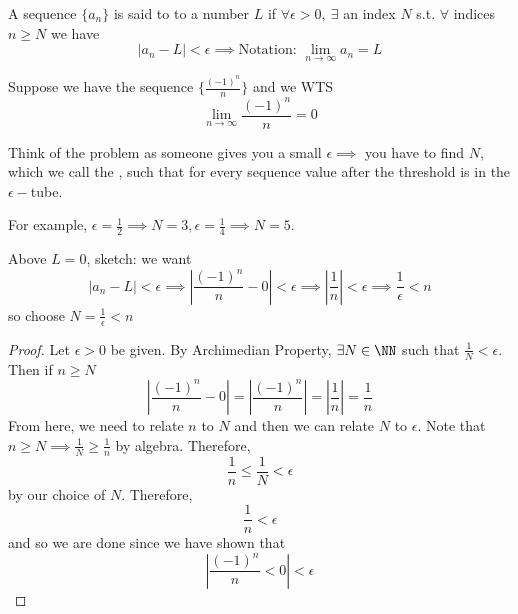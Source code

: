\documentclass[12pt]{scrartcl}
\begin{document}
\begin{definition}
  A sequence $\{a_n\}$ is said to  to a number $L$ if 
  $\forall \epsilon > 0, \ \exists$ an index $N$ s.t. $\forall $ indices $n \geq N$
  we have 
  \[|a_n - L| < \epsilon \implies \text{Notation: } \lim_{n\to\infty}a_n = L\]
\end{definition}

\begin{example}
  Suppose we have the sequence $\{\frac{(-1)^n}{n}\}$ and we WTS 
  \[\lim_{n\to\infty}\frac{(-1)^n}{n} = 0\]

  Think of the problem as someone gives you a small $\epsilon \implies$ you have to find $N$, 
  which we call the , such that for every sequence value after the threshold 
  is in the $\epsilon-$tube.

  For example, $\epsilon = \frac{1}{2} \implies N = 3, \epsilon = \frac{1}{4} \implies N = 5$.

  \hfill

  Above $L = 0$, sketch: we want 
  \[|a_n - L| < \epsilon \implies |\frac{(-1)^n}{n} - 0| < \epsilon \implies |\frac{1}{n}| < \epsilon \implies \frac{1}{\epsilon} < n\]
  so choose $N = \frac{1}{\epsilon} < n$

  \begin{proof}
    Let $\epsilon > 0$ be given. By Archimedian Property, $\exists N \in \NN$ such that 
    $\frac{1}{N} < \epsilon$. Then if $n \geq N$
    \[|\frac{(-1)^n}{n} - 0| = |\frac{(-1)^n}{n}| = |\frac{1}{n}| = \frac{1}{n}\]
    From here, we need to relate $n$ to $N$ and then we can relate $N$ to $\epsilon$. 
    Note that $n \geq N \implies \frac{1}{N} \geq \frac{1}{n}$ by algebra. Therefore, 
    \[\frac{1}{n} \leq \frac{1}{N} < \epsilon\]
    by our choice of $N$. Therefore, 
    \[\frac{1}{n} < \epsilon\] and 
    so we are done since we have shown that 
    \[|\frac{(-1)^n}{n} < 0| < \epsilon\]
  \end{proof}
\end{example}
\end{document}
